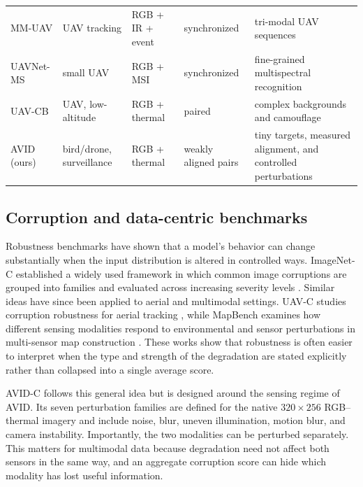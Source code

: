 \documentclass[10pt]{article}
\newcommand{\dataset}{\textsc{AVID}}
\newcommand{\corrupt}{\textsc{AVID-C}}
\begin{document}
\begin{table}[t]
\begin{threeparttable}
\begin{tabularx}{\linewidth}{@{}l l l l X@{}}
MM-UAV \citep{xu2025mmuav}
& UAV tracking
& RGB + IR + event
& synchronized
& tri-modal UAV sequences \\

UAVNet-MS \citep{luo2026uavnetms}
& small UAV
& RGB + MSI
& synchronized
& fine-grained multispectral recognition \\

UAV-CB \citep{huang2026uavcb}
& UAV, low-altitude
& RGB + thermal
& paired
& complex backgrounds and camouflage \\

\rowcolor{blue!4}
\dataset{} (ours)
& bird/drone, surveillance
& RGB + thermal
& weakly aligned pairs
& tiny targets, measured alignment, and controlled perturbations \\
\bottomrule
\end{tabularx}
\end{threeparttable}
\end{table}

\subsection{Corruption and data-centric benchmarks}

Robustness benchmarks have shown that a model's behavior can change substantially when the input distribution is altered in controlled ways. ImageNet-C established a widely used framework in which common image corruptions are grouped into families and evaluated across increasing severity levels \citep{hendrycks2019benchmarking}. Similar ideas have since been applied to aerial and multimodal settings. UAV-C studies corruption robustness for aerial tracking \citep{liu2024uavc}, while MapBench examines how different sensing modalities respond to environmental and sensor perturbations in multi-sensor map construction \citep{hao2024mapbench}. These works show that robustness is often easier to interpret when the type and strength of the degradation are stated explicitly rather than collapsed into a single average score.

\corrupt{} follows this general idea but is designed around the sensing regime of \dataset{}. Its seven perturbation families are defined for the native $320\times256$ RGB--thermal imagery and include noise, blur, uneven illumination, motion blur, and camera instability. Importantly, the two modalities can be perturbed separately. This matters for multimodal data because degradation need not affect both sensors in the same way, and an aggregate corruption score can hide which modality has lost useful information.
\end{document}
